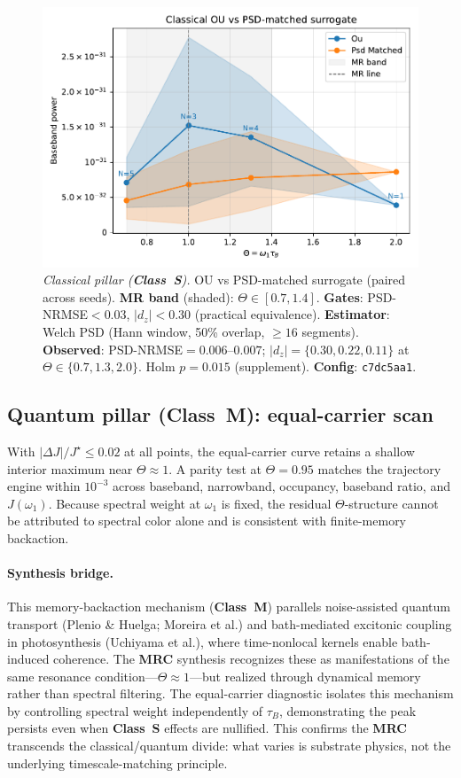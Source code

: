 \documentclass[11pt,letterpaper]{article}
\newcommand{\confighash}{c7dc5aa1}
\DeclareRobustCommand{\mrc}{\textbf{MRC}\xspace}
\DeclareRobustCommand{\classS}{\textbf{Class~S}\xspace}
\DeclareRobustCommand{\classM}{\textbf{Class~M}\xspace}
\begin{document}
\begin{figure}[t]
\centering
\includegraphics[width=0.8\linewidth]{figures/figA_classical.pdf}
\caption{\emph{Classical pillar (\classS).} OU vs PSD-matched surrogate (paired across seeds). \textbf{MR band} (shaded): $\Theta\in[0.7,1.4]$. \textbf{Gates}: PSD-NRMSE$<0.03$, $|d_z|<0.30$ (practical equivalence). \textbf{Estimator}: Welch PSD (Hann window, 50\% overlap, $\ge\!16$ segments). \textbf{Observed}: PSD-NRMSE$=0.006$--$0.007$; $|d_z|=\{0.30,0.22,0.11\}$ at $\Theta\in\{0.7,1.3,2.0\}$. Holm $p=0.015$ (supplement). \textbf{Config}: \texttt{\confighash}.}
\end{figure}

\subsection{Quantum pillar (\classM): equal-carrier scan}
With $|\Delta J|/J^\star\le 0.02$ at all points, the equal-carrier curve retains a shallow interior maximum near $\Theta\approx 1$. A parity test at $\Theta=0.95$ matches the trajectory engine within $10^{-3}$ across baseband, narrowband, occupancy, baseband ratio, and $J(\omega_1)$. Because spectral weight at $\omega_1$ is fixed, the residual $\Theta$-structure cannot be attributed to spectral color alone and is consistent with finite-memory backaction.

\paragraph*{Synthesis bridge.} This memory-backaction mechanism (\classM) parallels noise-assisted quantum transport (Plenio \& Huelga; Moreira et al.) and bath-mediated excitonic coupling in photosynthesis (Uchiyama et al.), where time-nonlocal kernels enable bath-induced coherence. The \mrc synthesis recognizes these as manifestations of the same resonance condition---$\Theta\!\approx\!1$---but realized through dynamical memory rather than spectral filtering. The equal-carrier diagnostic isolates this mechanism by controlling spectral weight independently of $\tau_B$, demonstrating the peak persists even when \classS{} effects are nullified. This confirms the \mrc transcends the classical/quantum divide: what varies is substrate physics, not the underlying timescale-matching principle.
\end{document}
